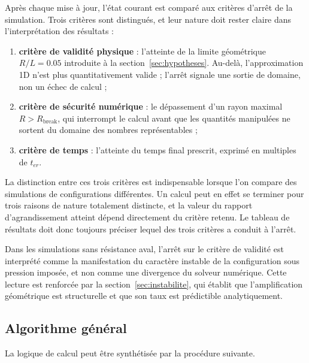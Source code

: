 \documentclass[11pt,a4paper]{report}
\newcommand{\ter}{{t_{er}}}
\begin{document}
Après chaque mise à jour, l'état courant est comparé aux critères d'arrêt de la simulation. Trois critères
sont distingués, et leur nature doit rester claire dans l'interprétation des résultats :
\begin{enumerate}
  \item \textbf{critère de validité physique} : l'atteinte de la limite géométrique \(R/L = 0.05\)
        introduite à la section~\ref{sec:hypotheses}. Au-delà, l'approximation 1D n'est plus
        quantitativement valide ; l'arrêt signale une sortie de domaine, non un échec de calcul ;
  \item \textbf{critère de sécurité numérique} : le dépassement d'un rayon maximal
        \(R > R_{\mathrm{break}}\), qui interrompt le calcul avant que les quantités manipulées ne
        sortent du domaine des nombres représentables ;
  \item \textbf{critère de temps} : l'atteinte du temps final prescrit, exprimé en multiples de
        \(\ter\).
\end{enumerate}
La distinction entre ces trois critères est indispensable lorsque l'on compare des simulations de
configurations différentes. Un calcul peut en effet se terminer pour trois raisons de nature totalement
distincte, et la valeur du rapport d'agrandissement atteint dépend directement du critère retenu. Le
tableau de résultats doit donc toujours préciser lequel des trois critères a conduit à l'arrêt.

Dans les simulations sans résistance aval, l'arrêt sur le critère de validité est interprété comme la
manifestation du caractère instable de la configuration sous pression imposée, et non comme une divergence
du solveur numérique. Cette lecture est renforcée par la section~\ref{sec:instabilite}, qui établit que
l'amplification géométrique est structurelle et que son taux est prédictible analytiquement.

\subsection{Algorithme général}

La logique de calcul peut être synthétisée par la procédure suivante.
\end{document}
